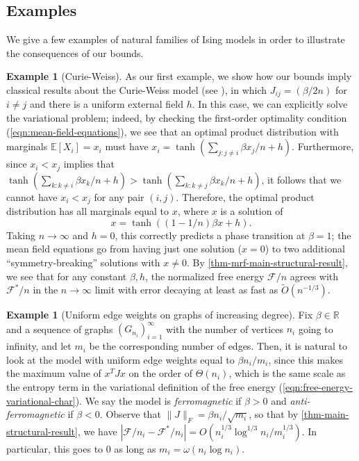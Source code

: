 \documentclass[final, 12pt]{colt2018}
\newcommand{\bE}{\mathbb{E}}
\newcommand{\E}{\bE}      %
\theoremstyle{definition}
\newtheorem{example}[theorem]{Example}
\theoremstyle{plain}
\begin{document}
\subsection{Examples}
We give a few examples of natural families of Ising models in order to illustrate the consequences
of our bounds.
\begin{example}[Curie-Weiss]\label{example:curie-weiss}
As our first example, we show how our bounds imply classical
results about the Curie-Weiss model (see \citet{ellis-newman}), in which $J_{ij} = (\beta/2n)$
for $i \ne j$ and there is a uniform external field $h$. In this case, we can explicitly solve the variational problem;
indeed, by checking the first-order optimality condition (\cref{eqn:mean-field-equations}), we see that an optimal
product distribution with marginals $\E[X_i] = x_i$ must have 
$x_i = \tanh(\sum_{j: j \ne i} \beta x_j/n + h)$.
Furthermore, since $x_i < x_j$ implies that $\tanh(\sum_{k: k \ne i} \beta x_k/n + h) > \tanh(\sum_{k: k \ne j} \beta x_k/n + h)$, it follows that  we cannot have $x_i < x_j$ for any pair $(i,j)$. %
Therefore, the optimal product distribution has all marginals equal to $x$, where $x$ is a solution of
\[ x = \tanh((1 - 1/n) \beta x + h). \]
Taking $n \to \infty$ and $h = 0$, this correctly predicts a phase transition at $\beta = 1$; the mean field equations go from having just one solution ($x = 0$) to two additional ``symmetry-breaking'' solutions with $x \ne 0$. By \cref{thm-mrf-main-structural-result}, we see that for any 
constant $\beta,h$, the normalized free energy $\mathcal{F}/n$ agrees with $\mathcal{F}^*/n$ in the $n \to \infty$ limit with error decaying at least as fast as $\tilde{O}(n^{-1/3})$.
\end{example}
\begin{example}[Uniform edge weights on graphs of increasing degree]
Fix $\beta \in \mathbb{R}$ and a sequence of graphs
$(G_{n_i})_{i = 1}^{\infty}$ with the number of vertices $n_i$ going to infinity, and let $m_i$ be the corresponding number of edges. Then, it is natural to look at the model
with uniform edge weights equal to $\beta n_i/m_i$, since this makes
the maximum value of $x^T J x$ on the order of $\Theta(n_i)$, which is 
the same scale as the entropy term in the variational definition of the free energy (\cref{eqn:free-energy-variational-char}). We say the model is \emph{ferromagnetic} if $\beta > 0$ and \emph{anti-ferromagnetic} if $\beta < 0$. Observe that $\|J\|_F = \beta n_i/\sqrt{m_i}$, so that by \cref{thm-main-structural-result}, we have $|\mathcal{F}/n_i - \mathcal{F}^*/n_i| = O(n_i^{1/3}\log^{1/3}{n_i}/m_i^{1/3})$. In particular, this goes to $0$ as long as $m_i = \omega(n_i \log n_i)$.
\end{example}
\end{document}
